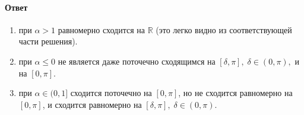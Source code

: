 \documentclass[11pt]{article}
\begin{document}
\paragraph{Ответ}

\begin{enumerate}
    \item при $\alpha > 1$ равномерно сходится на $\mathbb{R}$ (это легко видно из соответствующей части решения).
    \item при $\alpha \leq 0$ не является даже поточечно сходящимся на $[\delta, \pi], \; \delta \in (0, \pi),$ и на $[0, \pi]$.
    \item при $\alpha \in (0, 1]$ сходится поточечно на $[0, \pi]$, но не сходится равномерно на $[0, \pi]$, и сходится равномерно на $[\delta, \pi], \; \delta \in (0, \pi)$.
\end{enumerate}
\end{document}
